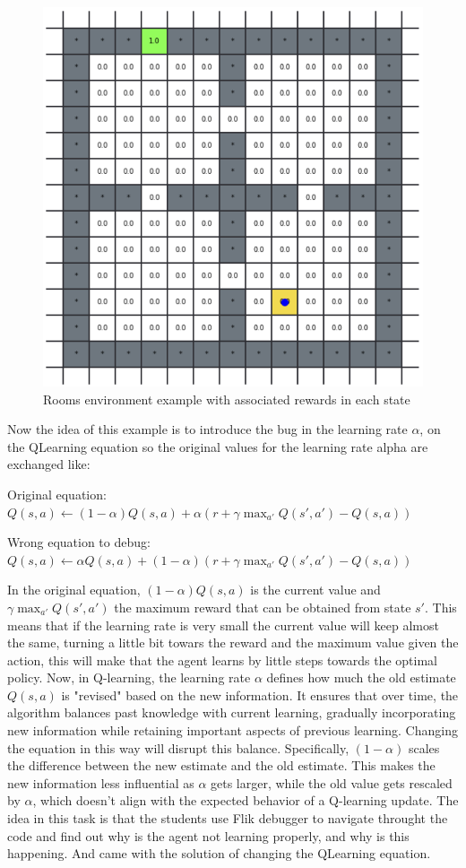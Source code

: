 \begin{figure}[h]
  \centering
  \includegraphics[width=0.5\columnwidth]{figures/rooms.png}
  \caption{Rooms environment example with associated rewards in each state}
  \label{fig:rooms}
\end{figure}

Now the idea of this example is to introduce the bug in the learning rate $\alpha$, on the QLearning equation 
so the original values for the learning rate alpha are exchanged like:

Original equation:
$
Q(s, a) \leftarrow (1-\alpha) Q(s, a) + \alpha \left( r + \gamma \max_{a'} Q(s', a') - Q(s, a) \right)
$

Wrong equation to debug:
$
Q(s, a) \leftarrow  \alpha Q(s, a) + (1-\alpha) \left( r + \gamma \max_{a'} Q(s', a') - Q(s, a) \right)
$

In the original equation,  $(1-\alpha) Q(s, a)$ is the current value and $\gamma \max_{a'} Q(s', a')$ the maximum 
reward that can be obtained from state $s'$. This means that if the learning rate is very small the current value 
will keep almost the same, turning a little bit towars the reward and the maximum value given the action, this will 
make that the agent learns by little steps towards the optimal policy. Now, in Q-learning, the learning rate $\alpha$
defines how much the old estimate $Q(s,a)$ is "revised" based on the new information. It ensures that over time, 
the algorithm balances past knowledge with current learning, gradually incorporating new information while 
retaining important aspects of previous learning. Changing the equation in this way will disrupt this balance. Specifically,
 $(1-\alpha)$ scales the difference between the new estimate and the old estimate. This makes the new information less influential as $\alpha$ gets larger, while the old value gets rescaled by $\alpha$, which doesn't align with the expected behavior of a Q-learning update. The idea in this task is that the students use Flik debugger to navigate throught 
the code and find out why is the agent not learning properly, and why is this happening. And came with the solution of changing the QLearning equation.


